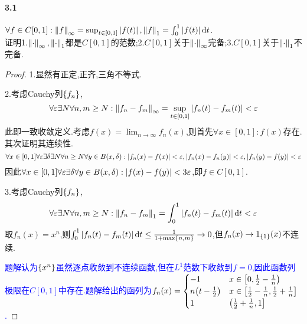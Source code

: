 \documentclass[UTF8]{article}
\begin{document}
\paragraph*{3.1}$\forall f\in C[0,1]:\left\|f\right\|_\infty=\sup_{t\in [0,1]}\left|f(t)\right|, \left\|f\right\|_1=\int_0^1\left|f(t)\right|\mathrm{d} t$.\\
证明1.$\left\|\cdot\right\|_\infty,\left\|\cdot\right\|_1$都是$C[0,1]$的范数;2.$C[0,1]$关于$\left\|\cdot\right\|_\infty$完备;3.$C[0,1]$关于$\left\|\cdot\right\|_1$不完备.
\begin{proof}
    1.显然有正定,正齐,三角不等式.

    2.考虑Cauchy列$\left\{f_n\right\}$,$$\forall \varepsilon\exists N\forall n,m\geq N:\left\|f_n-f_m\right\|_\infty=\sup_{t\in [0,1]}\left|f_n(t)-f_m(t)\right|<\varepsilon$$
    此即一致收敛定义.考虑$f(x)=\lim_{n\to\infty}f_n(x)$,则首先$\forall x\in [0,1]:f(x)$存在.其次证明其连续性.$$\forall x\in [0,1]\forall \varepsilon\exists \delta\exists N\forall n\geq N\forall y\in B(x,\delta):\left|f_n(x)-f(x)\right|<\varepsilon, \left|f_n(x)-f_n(y)\right|<\varepsilon, \left|f_n(y)-f(y)\right|<\varepsilon$$
    因此$\forall x\in [0,1]\forall \varepsilon\exists \delta\forall y\in B(x,\delta):\left|f(x)-f(y)\right|<3\varepsilon$,即$f\in C[0,1]$.

    3.考虑Cauchy列$\left\{f_n\right\}$,$$\forall \varepsilon\exists N\forall n,m\geq N:\left\|f_n-f_m\right\|_1=\int_0^1\left|f_n(t)-f_m(t)\right|\mathrm{d} t<\varepsilon$$
    取$f_n(x)=x^{n}$,则$\int_0^1\left|f_n(t)-f_m(t)\right|\mathrm{d} t\leq \frac{1}{1+\max\left\{n,m\right\}}\to 0$,但$f_n(x)\to 1_{\left\{1\right\}}(x)$不连续.

    \textcolor{blue}{题解认为$\left\{x^n\right\}$虽然逐点收敛到不连续函数,但在$L^1$范数下收敛到$f=0$,因此函数列极限在$C[0,1]$中存在.题解给出的函列为$f_n(x)=\begin{cases}
        -1&x\in \left[0,\frac{1}{2}-\frac{1}{n}\right)\\
        n\!\left(t-\frac{1}{2}\right)&x\in \left[\frac{1}{2}-\frac{1}{n},\frac{1}{2}+\frac{1}{n}\right]\\
        1&\left(\frac{1}{2}+\frac{1}{n},1\right]
    \end{cases}$.}
\end{proof}
\end{document}
